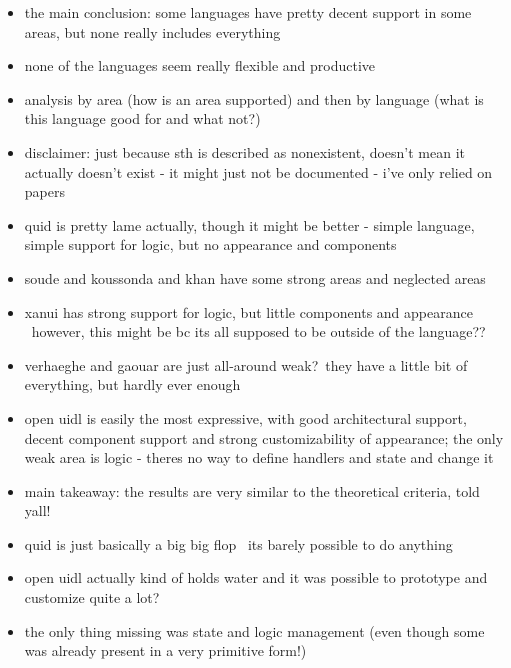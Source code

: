 \begin{itemize}
    \item the main conclusion: some languages have pretty decent support in some areas, but none really includes everything
    \item none of the languages seem really flexible and productive
    \item analysis by area (how is an area supported) and then by language (what is this language good for and what not?)
    \item disclaimer: just because sth is described as nonexistent, doesn't mean it actually doesn't exist - it might just not be documented - i've only relied on papers
    \item quid is pretty lame actually, though it might be better - simple language, simple support for logic, but no appearance and components
    \item soude and koussonda and khan have some strong areas and neglected areas
    \item xanui has strong support for logic, but little components and appearance \textendash\ however, this might be bc its all supposed to be outside of the language??
    \item verhaeghe and gaouar are just all-around weak?\ they have a little bit of everything, but hardly ever enough
    \item open uidl is easily the most expressive, with good architectural support, decent component support and strong customizability of appearance; the only weak area is logic - theres no way to define handlers and state and change it
\end{itemize}

\begin{itemize}
    \item main takeaway: the results are very similar to the theoretical criteria, told yall!
    \item quid is just basically a big big flop \textendash\ its barely possible to do anything 
    \item open uidl actually kind of holds water and it was possible to prototype and customize quite a lot?
    \item the only thing missing was state and logic management (even though some was already present in a very primitive form!)
\end{itemize}

